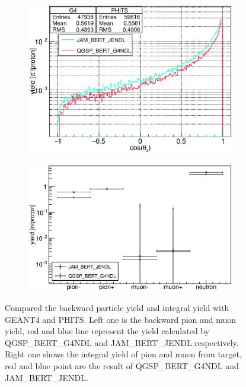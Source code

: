   \begin{figure}[H]
   \begin{subfigure}{0.3\textwidth}
    \centering
	\includegraphics[scale=0.43]{chapter3/fig/backward.eps}
   \end{subfigure}
   \hspace{0.2\textwidth}
   \begin{subfigure}{0.3\textwidth}
    \centering
	\includegraphics[scale=0.43]{chapter3/fig/production.eps}
   \end{subfigure}
   \caption{Compared the backward particle yield and integral yield with GEANT4 and PHITS. Left one is the backward pion and muon yield, red and blue line represent the yield calculated by QGSP\_BERT\_G4NDL and JAM\_BERT\_JENDL respectively. Right one shows the integral yield of pion and muon from target, red and blue point are the result of QGSP\_BERT\_G4NDL and JAM\_BERT\_JENDL.}
   \label{model}
  \end{figure}

